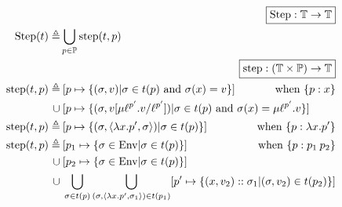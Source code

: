 \begin{align*}
                             & \pushright{\fbox{$\Step:\mathbb{T}\rightarrow\mathbb{T}$}}                                                                                                                                                              \\
  \Step(\ptree)   \triangleq & \bigcup_{p\in\mathbb{P}}\step(\ptree,p)                                                                                                                                                                                 \\
                             & \pushright{\fbox{$\step:(\mathbb{T}\times\mathbb{P})\rightarrow\mathbb{T}$}}                                                                                                                                            \\
  \step(\ptree,p) \triangleq & \specialcell{\:[p\mapsto\{(\ctx,v)|\ctx\in\ptree(p)\textnormal{ and }\ctx(x)=v\}]\hfill\textnormal{when }\plabel{p}{x}}                                                                                                 \\
  \cup                       & \: [p\mapsto\{(\ctx,v[\mu\llabel{p'}{\ell}.v/\llabel{p'}{\ell}])|\ctx\in \ptree(p)\textnormal{ and }\ctx(x)=\mu\llabel{p'}{\ell}.v\}]                                                                                   \\
  \step(\ptree,p) \triangleq & \specialcell{\:[p\mapsto\{(\ctx,\langle\lambda x.p',\ctx\rangle)|\ctx\in \ptree(p)\}]\hfill\textnormal{when }\plabel{p}{\lambda x.p'}}                                                                                  \\
  \step(\ptree,p) \triangleq & \specialcell{\:[p_1\mapsto\{\ctx\in\Ctx|\ctx\in \ptree(p)\}]\hfill\textnormal{when }\plabel{p}{p_1\:p_2}}                                                                                                               \\
  \cup                       & \: [p_2\mapsto\{\ctx\in\Ctx|\ctx\in \ptree(p)\}]                                                                                                                                                                        \\
  \cup                       & \: \bigcup_{\ctx\in \ptree(p)}\bigcup_{(\ctx,\langle\lambda x.p',\ctx_1\rangle)\in \ptree(p_1)}[p'\mapsto\{(x,v_2)\cons\ctx_1|(\ctx,v_2)\in \ptree(p_2)\}]                                                              \\

\end{align*}
